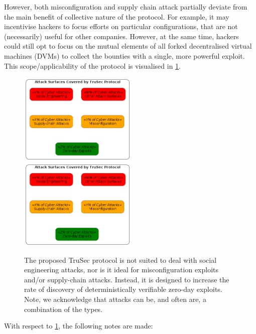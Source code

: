 However, both misconfiguration and supply chain attack partially deviate from the main benefit of collective nature of the protocol. For example, it may incentivise hackers to focus efforts on particular configurations, that are not (necessarily) useful for other companies. However, at the same time, hackers could still opt to focus on the mutual elements of all forked decentralised virtual machines (DVMs) to collect the bounties with a single, more powerful exploit. This scope/applicability of the protocol is visualised in \cref{fig:protocol_scope}.
\begin{figure}[H]
    \centering
    \ifx\homepath\overleafhome
        \includegraphics[width=0.50\textwidth]{Images/Diagrams/scope.png}
    \else
        \includegraphics[width=0.50\textwidth]{latex/Images/Diagrams/scope.png}
    \fi
    \caption{The proposed TruSec protocol is not suited to deal with social engineering attacks, nor is it ideal for misconfiguration exploits and/or supply-chain attacks. Instead, it is designed to increase the rate of discovery of deterministically verifiable zero-day exploits. Note, we acknowledge that attacks can be, and often are, a combination of the types.}
    \label{fig:protocol_scope}
\end{figure}
With respect to \cref{fig:protocol_scope}, the following notes are made:
